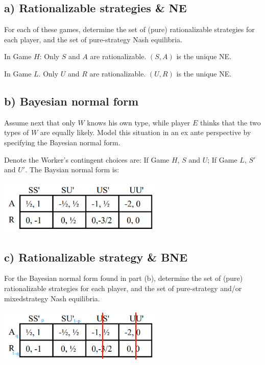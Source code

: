 \documentclass{article}
\begin{document}
\subsection*{a) Rationalizable strategies \& NE} For each of these games, determine the set of (pure) rationalizable strategies for each
player, and the set of pure-strategy Nash equilibria.

\bigskip

In Game $H$: Only $S$ and $A$ are rationalizable. $(S, A)$ is the unique NE. 

In Game $L$. Only $U$ and $R$ are rationalizable. $(U, R)$ is the unique NE.


\subsection*{b) Bayesian normal form} Assume next that only $W$ knows his own type, while player $E$ thinks that the two types
of $W$ are equally likely. Model this situation in an ex ante perspective by specifying
the Bayesian normal form.

\bigskip

Denote the Worker's contingent choices are: If Game $H$, $S$ and $U$; If Game $L$, $S'$ and $U'$. The Baysian normal form is:


\begin{center}
\includegraphics[width=0.6\textwidth]{12.q2_2}
\vspace{2mm}
\end{center}


\subsection*{c) Rationalizable strategy \& BNE} For the Bayesian normal form found in part (b), determine the set of (pure)
rationalizable strategies for each player, and the set of pure-strategy and/or mixedstrategy Nash equilibria.

\bigskip

\begin{center}
\includegraphics[width=0.6\textwidth]{12.q2_3}
\vspace{2mm}
\end{center}
\end{document}
